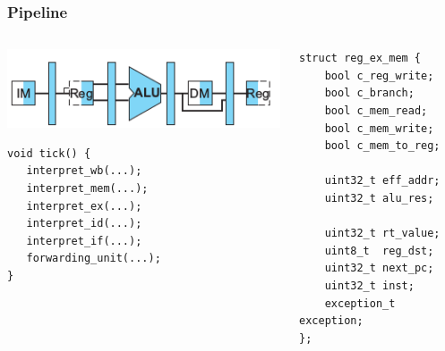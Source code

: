 \documentclass{beamer}
\begin{document}
\begin{frame}[fragile]
\frametitle{Pipeline}
\begin{columns}
\begin{column}{0.5\textwidth}

\includegraphics[scale=0.4]{simple_cpu.png}

\begin{verbatim}
void tick() {
   interpret_wb(...);
   interpret_mem(...);
   interpret_ex(...);
   interpret_id(...);
   interpret_if(...);
   forwarding_unit(...);
}
\end{verbatim}
\end{column}

\begin{column}{0.5\textwidth}

\begin{lstlisting}
struct reg_ex_mem {
	bool c_reg_write;
	bool c_branch;
	bool c_mem_read;
	bool c_mem_write;
	bool c_mem_to_reg;

	uint32_t eff_addr;
	uint32_t alu_res;

	uint32_t rt_value;
	uint8_t  reg_dst;
	uint32_t next_pc;
	uint32_t inst;
	exception_t exception;
};
\end{lstlisting}


\end{column}
\end{columns}
\end{frame}
\end{document}
